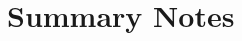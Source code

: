 \documentclass[10pt]{article}
\newcommand{\rulers}{\uline{\hfill\null }}
\begin{document}
\vspace{0.25in}

\section*{Summary Notes}
\begin{framed}
\vspace{0.25in}

\begin{description}
    \item \rulers
    \item \rulers
    \item \rulers
    \item \rulers
    \item \rulers
\end{description}
\vspace{0.25in}

\end{framed}

\vspace{0.2in}

 \rulers

\medskip

 \rulers
\end{document}
